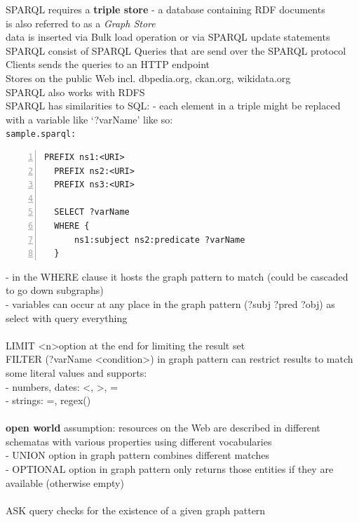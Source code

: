 SPARQL requires a \textbf{triple store} - a database containing RDF documents \\
is also referred to as a \textit{Graph Store} \\
data is inserted via Bulk load operation or via SPARQL update statements \\
SPARQL consist of SPARQL Queries that are send over the SPARQL protocol \\
Clients sends the queries to an HTTP endpoint \\
Stores on the public Web incl. dbpedia.org, ckan.org, wikidata.org \\
SPARQL also works with RDFS \\
SPARQL has similarities to SQL:
- each element in a triple might be replaced with a variable like `?varName' like so: \\
\texttt{sample.sparql:}
\begin{lstlisting}[basicstyle=\ttfamily,numbers=left,numberstyle=\footnotesize\ttfamily,backgroundcolor=\color{sourcegray}]
  PREFIX ns1:<URI>
  PREFIX ns2:<URI>
  PREFIX ns3:<URI>

  SELECT ?varName
  WHERE {
      ns1:subject ns2:predicate ?varName
  }
\end{lstlisting}
- in the WHERE clause it hosts the graph pattern to match (could be cascaded to go down subgraphs) \\
- variables can occur at any place in the graph pattern (?subj ?pred ?obj) as select with query everything \\
\\
LIMIT \textless n\textgreater option at the end for limiting the result set \\
FILTER (?varName \textless condition\textgreater ) in graph pattern can restrict results to match some
literal values and supports: \\
- numbers, dates: \textless, \textgreater, = \\
- strings: =, regex() \\
\\
\textbf{open world} assumption: resources on the Web are described in different schematas with various properties
using different vocabularies \\
- UNION option in graph pattern combines different matches \\
- OPTIONAL option in graph pattern only returns those entities if they are available (otherwise empty) \\
\\
ASK query checks for the existence of a given graph pattern \\
